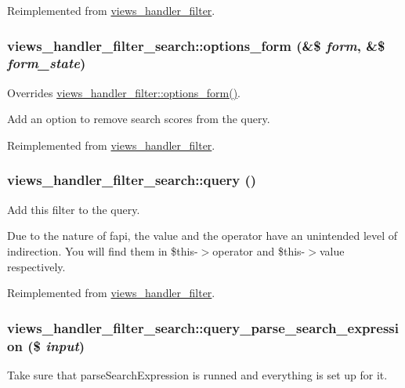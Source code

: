 Reimplemented from \hyperlink{classviews__handler__filter_a8c77c0a8bba8c3ceceae8950fc7b1121}{views\_\-handler\_\-filter}.\hypertarget{classviews__handler__filter__search_ada5367d9347c96ba96de10ed22ab7ea0}{
\subsubsection[{options\_\-form}]{\setlength{\rightskip}{0pt plus 5cm}views\_\-handler\_\-filter\_\-search::options\_\-form (\&\$ {\em form}, \/  \&\$ {\em form\_\-state})}}
\label{classviews__handler__filter__search_ada5367d9347c96ba96de10ed22ab7ea0}
Overrides \hyperlink{classviews__handler__filter_af14c69367162057a32709a6340de0988}{views\_\-handler\_\-filter::options\_\-form()}.

Add an option to remove search scores from the query. 

Reimplemented from \hyperlink{classviews__handler__filter_af14c69367162057a32709a6340de0988}{views\_\-handler\_\-filter}.\hypertarget{classviews__handler__filter__search_af972f15bdc716b36d04d9a9d4f20b6f5}{
\subsubsection[{query}]{\setlength{\rightskip}{0pt plus 5cm}views\_\-handler\_\-filter\_\-search::query ()}}
\label{classviews__handler__filter__search_af972f15bdc716b36d04d9a9d4f20b6f5}
Add this filter to the query.

Due to the nature of fapi, the value and the operator have an unintended level of indirection. You will find them in \$this-\/$>$operator and \$this-\/$>$value respectively. 

Reimplemented from \hyperlink{classviews__handler__filter_a8e513b3abbc2559f37b550ca4957b4ae}{views\_\-handler\_\-filter}.\hypertarget{classviews__handler__filter__search_a9904194e766321793c3b75f57526547b}{
\subsubsection[{query\_\-parse\_\-search\_\-expression}]{\setlength{\rightskip}{0pt plus 5cm}views\_\-handler\_\-filter\_\-search::query\_\-parse\_\-search\_\-expression (\$ {\em input})}}
\label{classviews__handler__filter__search_a9904194e766321793c3b75f57526547b}
Take sure that parseSearchExpression is runned and everything is set up for it.


